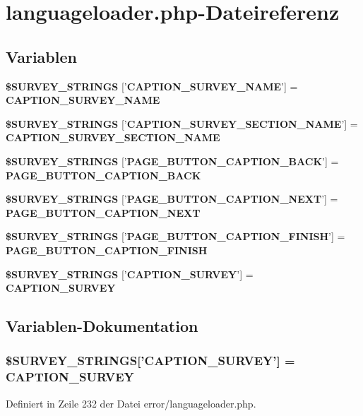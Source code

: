 \section{languageloader.php-Dateireferenz}
\label{error_2languageloader_8php}
\subsection*{Variablen}
\begin{CompactItemize}
\item 
{\bf \$SURVEY\_\-STRINGS} ['{\bf CAPTION\_\-SURVEY\_\-NAME}'] = {\bf CAPTION\_\-SURVEY\_\-NAME}
\item 
{\bf \$SURVEY\_\-STRINGS} ['{\bf CAPTION\_\-SURVEY\_\-SECTION\_\-NAME}'] = {\bf CAPTION\_\-SURVEY\_\-SECTION\_\-NAME}
\item 
{\bf \$SURVEY\_\-STRINGS} ['{\bf PAGE\_\-BUTTON\_\-CAPTION\_\-BACK}'] = {\bf PAGE\_\-BUTTON\_\-CAPTION\_\-BACK}
\item 
{\bf \$SURVEY\_\-STRINGS} ['{\bf PAGE\_\-BUTTON\_\-CAPTION\_\-NEXT}'] = {\bf PAGE\_\-BUTTON\_\-CAPTION\_\-NEXT}
\item 
{\bf \$SURVEY\_\-STRINGS} ['{\bf PAGE\_\-BUTTON\_\-CAPTION\_\-FINISH}'] = {\bf PAGE\_\-BUTTON\_\-CAPTION\_\-FINISH}
\item 
{\bf \$SURVEY\_\-STRINGS} ['{\bf CAPTION\_\-SURVEY}'] = {\bf CAPTION\_\-SURVEY}
\end{CompactItemize}


\subsection{Variablen-Dokumentation}
\subsubsection{\setlength{\rightskip}{0pt plus 5cm}\$SURVEY\_\-STRINGS['{\bf CAPTION\_\-SURVEY}'] = {\bf CAPTION\_\-SURVEY}}\label{error_2languageloader_8php_f4ecb6b9605321fc8c97c658a2011e16}




Definiert in Zeile 232 der Datei error/languageloader.php.

